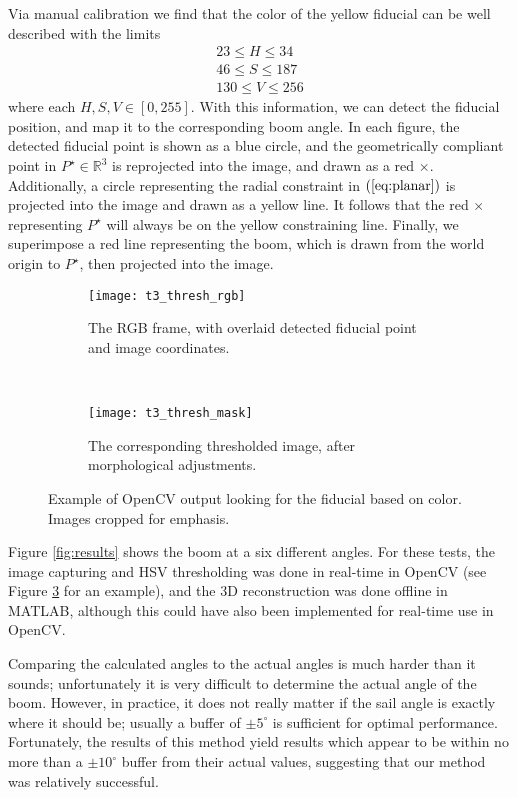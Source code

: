 \documentclass[letterpaper, 10 pt, conference]{ieeeconf}  %
\newcommand{\eq}[1]{$\left(\ref{eq:#1}\right)$}
\newcommand{\real}[1]{\mathbb{R}^{#1}}
\begin{document}
Via manual calibration we find that the color of the yellow fiducial can be well described with the limits
\begin{gather*}
23 \leq H \leq 34\\
46 \leq S \leq 187\\
130 \leq V \leq 256
\end{gather*} 
where each $H,S,V \in [0,255]$.
With this information, we can detect the fiducial position, and map it to the corresponding boom angle. In each figure, the detected fiducial point is shown as a blue circle, and the geometrically compliant point in $P^\star \in \real{3}$ is reprojected into the image, and drawn as a red $\times$. Additionally, a circle representing the radial constraint in \eq{planar} is projected into the image and drawn as a yellow line. It follows that the red $\times$ representing $P^\star$ will always be on the yellow constraining line. Finally, we superimpose a red line representing the boom, which is drawn from the world origin to $P^\star$, then projected into the image. 

\begin{figure}[htbp]

 \centering
         \begin{subfigure}[b]{0.23\textwidth}
                \texttt{[image: t3\_thresh\_rgb]}
                \caption{The RGB frame, with overlaid detected fiducial point and image coordinates.}
                \label{fig:t3_thresh_rgb}
        \end{subfigure}
        ~
        \begin{subfigure}[b]{0.23\textwidth}
                \texttt{[image: t3\_thresh\_mask]}
                \caption{The corresponding thresholded image, after morphological adjustments.}
                \label{fig:t3_thresh_mask}
        \end{subfigure}
  \caption{Example of OpenCV output looking for the fiducial based on color. Images cropped for emphasis.}
   \label{fig:t3_thresh}
\end{figure}

Figure \ref{fig:results} shows the boom at a six different angles. For these tests, the image capturing and HSV thresholding was done in real-time in OpenCV (see Figure \ref{fig:t3_thresh} for an example), and the 3D reconstruction  was done offline in MATLAB, although this could have also been implemented for real-time use in OpenCV.

Comparing the calculated angles to the actual angles is much harder than it sounds; unfortunately it is very difficult to determine the actual angle of the boom. However, in practice, it does not really matter if the sail angle is exactly where it should be; usually a buffer of $\pm 5^\circ$ is sufficient for optimal performance. Fortunately, the results of this method yield results which appear to be within no more than a $\pm 10 ^\circ$  buffer from their actual values, suggesting that our method was relatively successful.
\end{document}
